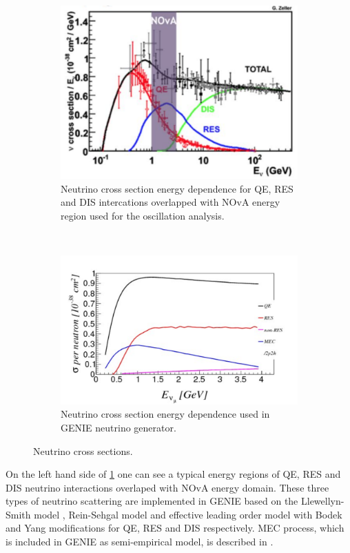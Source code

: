 \begin{figure}[t!]
\begin{subfigure}[t]{.5\textwidth}
  \centering
  \includegraphics[width=0.85\linewidth]{figures/nu_channels.pdf}
  \caption{Neutrino cross section energy dependence for QE, RES and DIS intercations overlapped with 
	NOvA energy region used for the oscillation analysis.}
  \label{fig:NovaEReg}
\end{subfigure}%
~
\begin{subfigure}[t]{.5\textwidth}
  \centering
  \includegraphics[width=1.1\linewidth]{figures/mec_xsec.pdf}
  \caption{Neutrino cross section energy dependence used in GENIE neutrino generator.}
  \label{fig:mecXsec}
\end{subfigure}
\caption{Neutrino cross sections.}
\label{fig:simPlots}
\end{figure}

On the left hand side of \ref{fig:NovaEReg} one can see a typical energy regions of QE, RES and DIS neutrino 
interactions overlaped with NOvA energy domain. These three types of neutrino scattering are implemented 
in GENIE based on the Llewellyn-Smith model \cite{QE}, Rein-Sehgal model \cite{RES} and effective leading 
order model with Bodek and Yang modifications \cite{DIS} for QE, RES and DIS respectively. MEC process, 
which is included in GENIE as semi-empirical model, is described in \cite{MEC}.

